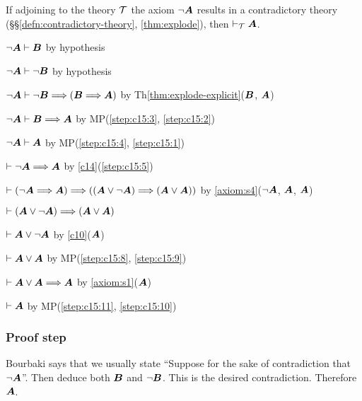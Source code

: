 \begin{dc}\label{c15}
If adjoining to the theory $\mathcal{T}$ the axiom $\neg\boldsymbol{A}$
results in a contradictory theory (\S\S\ref{defn:contradictory-theory}, \ref{thm:explode}),
then $\vdash_{\mathcal{T}}\boldsymbol{A}$.
\end{dc}

\begin{pf}
\item\label{step:c15:1} $\neg\boldsymbol{A}\vdash\boldsymbol{B}$
by hypothesis
\item\label{step:c15:2} $\neg\boldsymbol{A}\vdash\neg\boldsymbol{B}$
by hypothesis
\item\label{step:c15:3} $\neg\boldsymbol{A}\vdash\neg\boldsymbol{B}\Longrightarrow(\boldsymbol{B}\Longrightarrow\boldsymbol{A})$
by Th\ref{thm:explode-explicit}($\boldsymbol{B}$, $\boldsymbol{A}$)
\item\label{step:c15:4} $\neg\boldsymbol{A}\vdash\boldsymbol{B}\Longrightarrow\boldsymbol{A}$
  by MP(\ref{step:c15:3}, \ref{step:c15:2})
\item\label{step:c15:5} $\neg\boldsymbol{A}\vdash\boldsymbol{A}$
  by MP(\ref{step:c15:4}, \ref{step:c15:1})
\item\label{step:c15:6} $\vdash\neg\boldsymbol{A}\Longrightarrow\boldsymbol{A}$
  by \ref{c14}(\ref{step:c15:5})
\item\label{step:c15:7} $\vdash(\neg\boldsymbol{A}\Longrightarrow\boldsymbol{A})\Longrightarrow((\boldsymbol{A}\lor\neg\boldsymbol{A})\Longrightarrow(\boldsymbol{A}\lor\boldsymbol{A}))$
  by \ref{axiom:s4}($\neg\boldsymbol{A}$, $\boldsymbol{A}$, $\boldsymbol{A}$)
\item\label{step:c15:8} $\vdash(\boldsymbol{A}\lor\neg\boldsymbol{A})\Longrightarrow(\boldsymbol{A}\lor\boldsymbol{A})$
\item\label{step:c15:9} $\vdash\boldsymbol{A}\lor\neg\boldsymbol{A}$
  by \ref{c10}($\boldsymbol{A}$)
\item\label{step:c15:10} $\vdash\boldsymbol{A}\lor\boldsymbol{A}$ by MP(\ref{step:c15:8}, \ref{step:c15:9})
\item\label{step:c15:11} $\vdash\boldsymbol{A}\lor\boldsymbol{A}\Longrightarrow\boldsymbol{A}$
  by \ref{axiom:s1}($\boldsymbol{A}$)
\item\label{step:c15:1} $\vdash\boldsymbol{A}$ by MP(\ref{step:c15:11}, \ref{step:c15:10})
\end{pf}

\subsubsection{Proof step}
Bourbaki says that we usually state ``Suppose for the sake of
contradiction that $\neg\boldsymbol{A}$''. Then deduce both
$\boldsymbol{B}$ and $\neg\boldsymbol{B}$. This is the desired
contradiction. Therefore $\boldsymbol{A}$.

